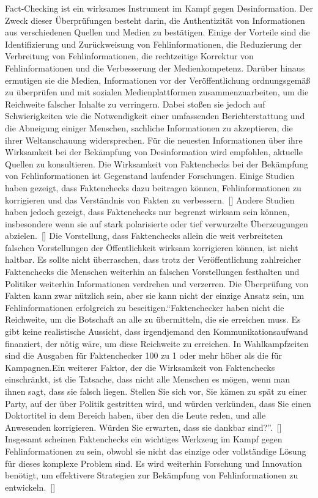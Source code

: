 \documentclass[a4paper,listof=totoc,bibliography=totoc]{scrartcl}
\begin{document}
Fact-Checking ist ein wirksames Instrument im Kampf gegen Desinformation. Der Zweck dieser Überprüfungen besteht darin, die Authentizität von Informationen aus 
verschiedenen Quellen und Medien zu bestätigen. Einige der Vorteile sind die Identifizierung und Zurückweisung von Fehlinformationen, die Reduzierung der Verbreitung 
von Fehlinformationen, die rechtzeitige Korrektur von Fehlinformationen und die Verbesserung der Medienkompetenz. Darüber hinaus ermutigen sie die Medien, Informationen 
vor der Veröffentlichung ordnungsgemäß zu überprüfen und mit sozialen Medienplattformen zusammenzuarbeiten, um die Reichweite falscher Inhalte zu verringern. Dabei 
stoßen sie jedoch auf Schwierigkeiten wie die Notwendigkeit einer umfassenden Berichterstattung und die Abneigung einiger Menschen, sachliche Informationen zu akzeptieren, 
die ihrer Weltanschauung widersprechen. Für die neuesten Informationen über ihre Wirksamkeit bei der Bekämpfung von Desinformation wird empfohlen, aktuelle Quellen zu konsultieren.
Die Wirksamkeit von Faktenchecks bei der Bekämpfung von Fehlinformationen ist Gegenstand laufender Forschungen. Einige Studien haben gezeigt, dass Faktenchecks 
dazu beitragen können, Fehlinformationen zu korrigieren und das Verständnis von Fakten zu verbessern.~[\cite{amazeen2018}] Andere Studien haben jedoch gezeigt, dass Faktenchecks nur 
begrenzt wirksam sein können, insbesondere wenn sie auf stark polarisierte oder tief verwurzelte Überzeugungen abzielen.~[\cite{nyhan2010}] Die Vorstellung, dass Faktenchecks allein 
die weit verbreiteten falschen Vorstellungen der Öffentlichkeit wirksam korrigieren können, ist nicht haltbar. Es sollte nicht überraschen, dass trotz der Veröffentlichung zahlreicher 
Faktenchecks die Menschen weiterhin an falschen Vorstellungen festhalten und Politiker weiterhin Informationen verdrehen und verzerren.
\newline
\newline
Die Überprüfung von Fakten kann zwar nützlich sein, 
aber sie kann nicht der einzige Ansatz sein, um Fehlinformationen erfolgreich zu beseitigen.``Faktenchecker haben nicht die Reichweite, um die Botschaft an alle zu übermitteln, die 
sie erreichen muss. Es gibt keine realistische Aussicht, dass irgendjemand den Kommunikationsaufwand finanziert, der nötig wäre, um diese Reichweite zu erreichen. In Wahlkampfzeiten 
sind die Ausgaben für Faktenchecker 100 zu 1 oder mehr höher als die für Kampagnen.Ein weiterer Faktor, der die Wirksamkeit von Faktenchecks einschränkt, ist die Tatsache, dass 
nicht alle Menschen es mögen, wenn man ihnen sagt, dass sie falsch liegen. Stellen Sie sich vor, Sie kämen zu spät zu einer Party, auf der über Politik gestritten wird, und würden 
verkünden, dass Sie einen Doktortitel in dem Bereich haben, über den die Leute reden, und alle Anwesenden korrigieren. Würden Sie erwarten, dass sie dankbar sind?''.~[\cite{FullFact:2019}] 
Insgesamt scheinen Faktenchecks ein wichtiges Werkzeug im Kampf gegen Fehlinformationen zu sein, obwohl sie nicht das einzige oder vollständige Lösung für dieses 
komplexe Problem sind. Es wird weiterhin Forschung und Innovation benötigt, um effektivere Strategien zur Bekämpfung von Fehlinformationen zu entwickeln.~[\cite{lewandowsky2020}]
\end{document}
